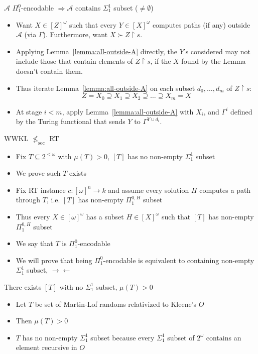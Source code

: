 \begin{frame}{$\mathcal{A}$ $\Pi_1^0$-encodable $\Rightarrow \mathcal{A}$
contains $\Sigma_1^1$ subset ($\neq\emptyset$)}
  \begin{itemize}
    \item Want $X\in[Z]^\omega$ such that every $Y\in[X]^\omega$ computes
      paths (if any) outside $\mathcal{A}$ (via $\Gamma$). Furthermore,
      want $X\succ Z\restriction s$.
    \item Applying Lemma~\ref{lemma:all-outside-A} directly,
      the $Y$'s considered may not include those that contain elements of
      $Z\restriction s$, if the $X$ found by the Lemma doesn't contain
      them.
    \item Thus iterate Lemma~\ref{lemma:all-outside-A} on each subset
      $d_0,\ldots,d_m$ of $Z\restriction s$:
      \[Z=X_0 \supseteq X_1 \supseteq X_2 \supseteq\ldots \supseteq X_m=X\]
    \item At stage $i<m$, apply Lemma~\ref{lemma:all-outside-A} with $X_i$,
      and $\Gamma^i$ defined by the Turing functional that sends $Y$ to
      $\Gamma^{Y\cup d_i}$.
  \end{itemize}
\end{frame}

\begin{frame}{WWKL $\nleq_{\text{soc}}$ RT}
  \begin{itemize}
    \item Fix $T\subseteq 2^{<\omega}$ with $\mu(T)>0$, $[T]$
      has no non-empty $\Sigma_1^1$ subset
    \item We prove such $T$ exists
    \item Fix RT instance $c:[\omega]^n\rightarrow k$ and assume every
      solution $H$ computes a path through $T$, i.e. $[T]$ has non-empty
      $\Pi_1^{0,H}$ subset
    \item Thus every $X\in[\omega]^\omega$ has a subset
      $H\in[X]^\omega$ such that $[T]$ has non-empty $\Pi_1^{0,H}$ subset
    \item We say that $T$ is $\Pi_1^0$-encodable
    \item We will prove that being $\Pi_1^0$-encodable is equivalent to
      containing non-empty $\Sigma_1^1$ subset, $\rightarrow\leftarrow$
  \end{itemize}
\end{frame}

\begin{frame}{There exists $[T]$ with no $\Sigma_1^1$ subset, $\mu(T)>0$}
  \begin{itemize}
    \item Let $T$ be set of Martin-Lof randoms relativized to Kleene's $O$
    \item Then $\mu(T)>0$
    \item $T$ has no non-empty $\Sigma_1^1$ subset because every
      $\Sigma_1^1$ subset of $2^\omega$ contains an element recursive in
      $O$
  \end{itemize}
\end{frame}

